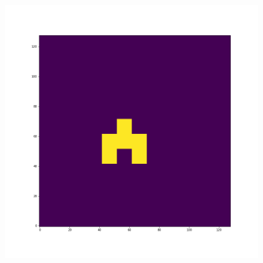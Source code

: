 \documentclass[12pt,a4paper]{article}
\begin{document}
\begin{figure}[H]
\begin{minipage}{.3\textwidth}
\end{minipage}%
\begin{minipage}{.3\textwidth}
  \centering
  \includegraphics[width=\linewidth]{Pictures/Solve2DWhiteBearMovementTestJR/Solve2DWhiteBearMovementTest_t20.png}
\end{minipage}
\end{figure}
\end{document}
